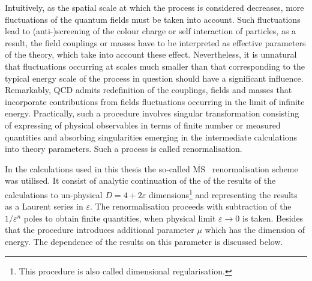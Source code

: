 Intuitively, as the spatial scale at which the process is considered decreases,  more fluctuations of the quantum fields must be taken into account. Such fluctuations lead to (anti-)screening of the colour charge or self interaction of particles, as a result, the field couplings or masses have to be interpreted as effective parameters of the theory, which take into account these effect. Nevertheless, it is unnatural that fluctuations occurring at scales much smaller than that corresponding to the typical energy scale of the process in question should have a significant influence. Remarkably, QCD admits redefinition of the couplings, fields and masses that incorporate contributions from fields fluctuations occurring in the limit of infinite energy. Practically, such a procedure involves singular transformation consisting of expressing of physical observables in terms of finite number or measured quantities and absorbing singularities emerging in the intermediate calculations into theory parameters. Such a process is called renormalisation. 

In the calculations used in this thesis the so-called $\overline{\mathrm{MS}}$~\cite{Bardeen:1978yd} renormalisation scheme was utilised. It consist of analytic continuation of the of the results of the calculations to un-physical $D=4+2\varepsilon$ dimensions\footnote{This procedure is also called dimensional regularisation.} and representing the results as a Laurent series in $\varepsilon$. The renormalisation proceeds with subtraction of the $1/\varepsilon^n$ poles to obtain finite quantities, when physical limit $\varepsilon \rightarrow 0$ is taken. Besides that the procedure introduces additional parameter $\mu$ which has the dimension of energy. The dependence of the results on this parameter is discussed below.
